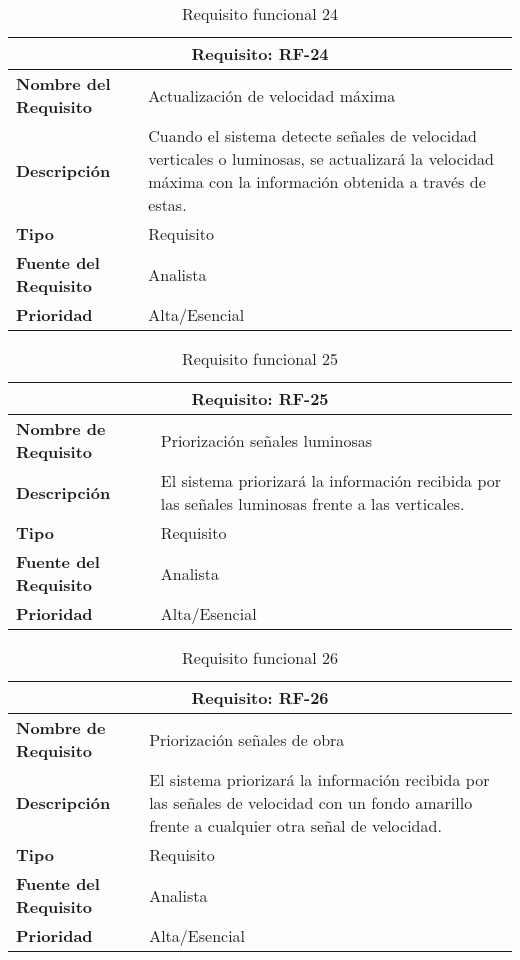 \begin{table}[H]
\begin{center}
\begin{tabular}{p{} p{7cm}}
\multicolumn{2}{c}{\textbf{Requisito: RF-24} } \\
\hline \hline
\textbf{Nombre del Requisito} & Actualización de velocidad máxima \\
\hline
\textbf{Descripción} & Cuando el sistema detecte señales de velocidad verticales o luminosas, se actualizará la velocidad máxima con la información obtenida a través de estas. \\
\hline
\textbf{Tipo} & Requisito \\
\hline
\textbf{Fuente del Requisito} & Analista \\
\hline
\textbf{Prioridad} & Alta/Esencial \\ \hline
\end{tabular}
\caption{Requisito funcional 24}
\label{tab:RF-24}
\end{center}
\end{table}

\begin{table}[H]
\begin{center}
\begin{tabular}{p{} p{7cm}}
\multicolumn{2}{c}{\textbf{Requisito: RF-25} } \\
\hline \hline
\textbf{Nombre de Requisito} & Priorización señales luminosas \\
\hline
\textbf{Descripción} & El sistema priorizará la información recibida por las señales luminosas frente a las verticales. \\
\hline
\textbf{Tipo} & Requisito \\
\hline
\textbf{Fuente del Requisito} & Analista \\
\hline
\textbf{Prioridad} & Alta/Esencial \\ \hline
\end{tabular}
\caption{Requisito funcional 25}
\label{tab:RF-25}
\end{center}
\end{table}

\begin{table}[H]
\begin{center}
\begin{tabular}{p{} p{7cm}}
\multicolumn{2}{c}{\textbf{Requisito: RF-26} } \\
\hline \hline
\textbf{Nombre de Requisito} & Priorización señales de obra\\
\hline
\textbf{Descripción} & El sistema priorizará la información recibida por las señales de velocidad con un fondo amarillo frente a cualquier otra señal de velocidad. \\
\hline
\textbf{Tipo} & Requisito \\
\hline
\textbf{Fuente del Requisito} & Analista \\
\hline
\textbf{Prioridad} & Alta/Esencial \\ \hline
\end{tabular}
\caption{Requisito funcional 26}
\label{tab:RF-26}
\end{center}
\end{table}

